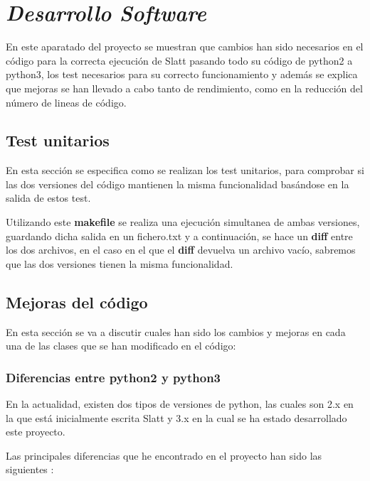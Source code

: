 \documentclass{cosas/tfg_domingo}
\begin{document}
\chapter{\emph{Desarrollo Software}}
En este aparatado del proyecto se muestran que cambios han sido necesarios en el código para la correcta ejecución de Slatt pasando todo su código de python2 a python3, los test necesarios para su correcto funcionamiento y además se explica que mejoras se han llevado a cabo tanto de rendimiento, como en la reducción del número de lineas de código.

\section{Test unitarios}

En esta sección se especifica como se realizan los test unitarios, para comprobar si las dos versiones del código mantienen la misma funcionalidad basándose en la salida de estos test.

\hfill



Utilizando este \textbf{makefile} se realiza una ejecución simultanea de ambas versiones, guardando dicha salida en un fichero.txt y a continuación, se hace un \textbf{diff} entre los dos archivos, en el caso en el que el \textbf{diff} devuelva un archivo vacío, sabremos que las dos versiones tienen la misma funcionalidad.

\section{Mejoras del código}
En esta sección se va a discutir cuales han sido los cambios y mejoras en cada una de las clases que se han modificado en el código:

\subsection{Diferencias entre python2 y python3}

En la actualidad, existen dos tipos de versiones de python, las cuales son 2.x en la que está inicialmente escrita Slatt y 3.x en la cual se ha estado desarrollado este proyecto.

Las principales diferencias que he encontrado en el proyecto han sido las siguientes \citep{diferencias}:
\end{document}
